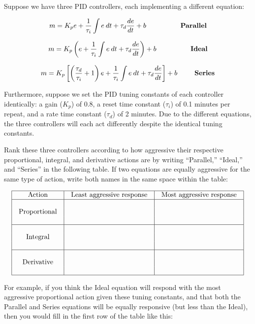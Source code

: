 

Suppose we have three PID controllers, each implementing a different equation:

$$m = K_p e + {1 \over \tau_i} \int e \> dt + \tau_d {de \over dt} + b \hbox{\hskip 50pt {\bf Parallel}}$$

\vskip 10pt

$$m = K_p \left( e + {1 \over \tau_i} \int e \> dt + \tau_d {de \over dt} \right) + b \hbox{\hskip 50pt {\bf Ideal}}$$

\vskip 10pt

$$m = K_p \left[ \left({\tau_d \over \tau_i} + 1 \right) e + {1 \over \tau_i} \int e \> dt + \tau_d {de \over dt} \right] + b \hbox{\hskip 25pt {\bf Series}}$$

Furthermore, suppose we set the PID tuning constants of each controller identically: a gain ($K_p$) of 0.8, a reset time constant ($\tau_i$) of 0.1 minutes per repeat, and a rate time constant ($\tau_d$) of 2 minutes.  Due to the different equations, the three controllers will each act differently despite the identical tuning constants.

Rank these three controllers according to how aggressive their respective proportional, integral, and derivative actions are by writing ``Parallel,'' ``Ideal,'' and ``Series'' in the following table.  If two equations are equally aggressive for the same type of action, write both names in the same space within the table:


$$\vbox{\offinterlineskip
\halign{\strut
\vrule \quad\hfil # \ \hfil & 
\vrule \quad\hfil # \ \hfil & 
\vrule \quad\hfil # \ \hfil \vrule \cr
\noalign{\hrule}
%
Action & Least aggressive response & Most aggressive response \cr
%
\noalign{\hrule}
%
 &  &  \cr
Proportional &  &  \cr
 &  &  \cr
%
\noalign{\hrule}
%
 &  &  \cr
Integral &  &  \cr
 &  &  \cr
%
\noalign{\hrule}
%
 &  &  \cr
Derivative &  &  \cr
 &  &  \cr
%
\noalign{\hrule}
} %
}$$ %

For example, if you think the Ideal equation will respond with the most aggressive proportional action given these tuning constants, and that both the Parallel and Series equations will be equally responsive (but less than the Ideal), then you would fill in the first row of the table like this:

